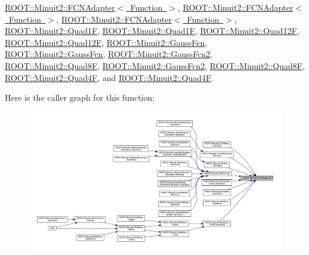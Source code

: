 \mbox{\hyperlink{classROOT_1_1Minuit2_1_1FCNAdapter_a3bcb29efda3b97c17bb17512c1629365}{R\+O\+O\+T\+::\+Minuit2\+::\+F\+C\+N\+Adapter$<$ Function $>$}}, \mbox{\hyperlink{classROOT_1_1Minuit2_1_1FCNAdapter_a3bcb29efda3b97c17bb17512c1629365}{R\+O\+O\+T\+::\+Minuit2\+::\+F\+C\+N\+Adapter$<$ Function $>$}}, \mbox{\hyperlink{classROOT_1_1Minuit2_1_1FCNAdapter_a3bcb29efda3b97c17bb17512c1629365}{R\+O\+O\+T\+::\+Minuit2\+::\+F\+C\+N\+Adapter$<$ Function $>$}}, \mbox{\hyperlink{classROOT_1_1Minuit2_1_1Quad1F_a14469d6031751fa382120df6327da5ee}{R\+O\+O\+T\+::\+Minuit2\+::\+Quad1F}}, \mbox{\hyperlink{classROOT_1_1Minuit2_1_1Quad1F_a14469d6031751fa382120df6327da5ee}{R\+O\+O\+T\+::\+Minuit2\+::\+Quad1F}}, \mbox{\hyperlink{classROOT_1_1Minuit2_1_1Quad12F_afbb216349fbceafc530845fe1cff5af4}{R\+O\+O\+T\+::\+Minuit2\+::\+Quad12F}}, \mbox{\hyperlink{classROOT_1_1Minuit2_1_1Quad12F_afbb216349fbceafc530845fe1cff5af4}{R\+O\+O\+T\+::\+Minuit2\+::\+Quad12F}}, \mbox{\hyperlink{classROOT_1_1Minuit2_1_1GaussFcn_a7e73468f853c287df3b5da240c3b5bb5}{R\+O\+O\+T\+::\+Minuit2\+::\+Gauss\+Fcn}}, \mbox{\hyperlink{classROOT_1_1Minuit2_1_1GaussFcn_a7e73468f853c287df3b5da240c3b5bb5}{R\+O\+O\+T\+::\+Minuit2\+::\+Gauss\+Fcn}}, \mbox{\hyperlink{classROOT_1_1Minuit2_1_1GaussFcn2_aef7172f9af50244bc9fce0c96cc21e81}{R\+O\+O\+T\+::\+Minuit2\+::\+Gauss\+Fcn2}}, \mbox{\hyperlink{classROOT_1_1Minuit2_1_1Quad8F_a8f241ff1340ea2184c7ee9247b8b200a}{R\+O\+O\+T\+::\+Minuit2\+::\+Quad8F}}, \mbox{\hyperlink{classROOT_1_1Minuit2_1_1GaussFcn2_aef7172f9af50244bc9fce0c96cc21e81}{R\+O\+O\+T\+::\+Minuit2\+::\+Gauss\+Fcn2}}, \mbox{\hyperlink{classROOT_1_1Minuit2_1_1Quad8F_a8f241ff1340ea2184c7ee9247b8b200a}{R\+O\+O\+T\+::\+Minuit2\+::\+Quad8F}}, \mbox{\hyperlink{classROOT_1_1Minuit2_1_1Quad4F_a19ebb5413722895a7635626cca02ebe9}{R\+O\+O\+T\+::\+Minuit2\+::\+Quad4F}}, and \mbox{\hyperlink{classROOT_1_1Minuit2_1_1Quad4F_a19ebb5413722895a7635626cca02ebe9}{R\+O\+O\+T\+::\+Minuit2\+::\+Quad4F}}.

Here is the caller graph for this function\+:
\nopagebreak
\begin{figure}[H]
\begin{center}
\leavevmode
\includegraphics[width=350pt]{dd/df4/classROOT_1_1Minuit2_1_1FCNBase_a04ef08ddad92ce8d89d498efbe021c39_icgraph}
\end{center}
\end{figure}
\mbox{\label{classROOT_1_1Minuit2_1_1FCNBase_a04ef08ddad92ce8d89d498efbe021c39}} 
